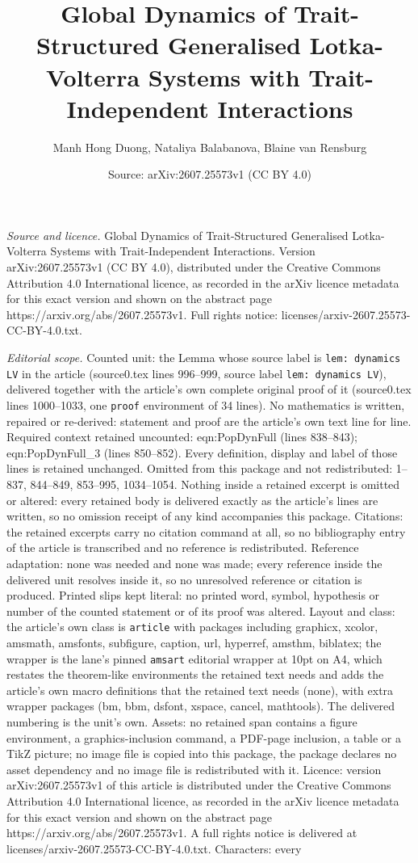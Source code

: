 \documentclass[10pt,a4paper]{amsart}
\title[Global Dynamics of Trait-Structured Generalised Lotka-Volter]{Global Dynamics of Trait-Structured Generalised Lotka-Volterra Systems with Trait-Independent Interactions}
\author{Manh Hong Duong, Nataliya Balabanova, Blaine van Rensburg}
\date{Source: arXiv:2607.25573v1 (CC BY 4.0)}
\begin{document}
\maketitle

\noindent\emph{Source and licence.} Global Dynamics of Trait-Structured Generalised Lotka-Volterra Systems with Trait-Independent Interactions. Version arXiv:2607.25573v1 (CC BY 4.0), distributed under the Creative Commons Attribution 4.0 International licence, as recorded in the arXiv licence metadata for this exact version and shown on the abstract page https://arxiv.org/abs/2607.25573v1. Full rights notice: licenses/arxiv-2607.25573-CC-BY-4.0.txt.\par\smallskip

\noindent\textit{Editorial scope.} Counted unit: the Lemma whose source label is \texttt{lem: dynamics LV} in the article (source0.tex lines 996--999, source label \texttt{lem: dynamics LV}), delivered together with the article's own complete original proof of it (source0.tex lines 1000--1033, one \texttt{proof} environment of 34 lines). No mathematics is written, repaired or re-derived: statement and proof are the article's own text line for line. Required context retained uncounted: eqn:PopDynFull (lines 838--843); eqn:PopDynFull\_3 (lines 850--852). Every definition, display and label of those lines is retained unchanged. Omitted from this package and not redistributed: 1--837, 844--849, 853--995, 1034--1054. Nothing inside a retained excerpt is omitted or altered: every retained body is delivered exactly as the article's lines are written, so no omission receipt of any kind accompanies this package. Citations: the retained excerpts carry no citation command at all, so no bibliography entry of the article is transcribed and no reference is redistributed. Reference adaptation: none was needed and none was made; every reference inside the delivered unit resolves inside it, so no unresolved reference or citation is produced. Printed slips kept literal: no printed word, symbol, hypothesis or number of the counted statement or of its proof was altered. Layout and class: the article's own class is \texttt{article} with packages including graphicx, xcolor, amsmath, amsfonts, subfigure, caption, url, hyperref, amsthm, biblatex; the wrapper is the lane's pinned \texttt{amsart} editorial wrapper at 10pt on A4, which restates the theorem-like environments the retained text needs and adds the article's own macro definitions that the retained text needs (none), with extra wrapper packages (bm, bbm, dsfont, xspace, cancel, mathtools). The delivered numbering is the unit's own. Assets: no retained span contains a figure environment, a graphics-inclusion command, a PDF-page inclusion, a table or a TikZ picture; no image file is copied into this package, the package declares no asset dependency and no image file is redistributed with it. Licence: version arXiv:2607.25573v1 of this article is distributed under the Creative Commons Attribution 4.0 International licence, as recorded in the arXiv licence metadata for this exact version and shown on the abstract page https://arxiv.org/abs/2607.25573v1. A full rights notice is delivered at licenses/arxiv-2607.25573-CC-BY-4.0.txt. Characters: every 
\end{document}
